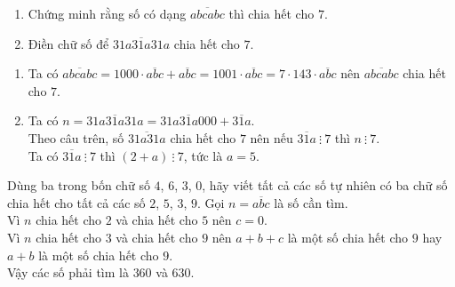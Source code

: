 \begin{bt}%
 \textrm{}
 \begin{enumerate}
  \item Chứng minh rằng số có dạng $\overline{abcabc}$ thì chia hết cho $7$.
  \item Điền chữ số để $\overline{31a31a31a}$ chia hết cho $7$.
 \end{enumerate}
 \loigiai
  {
  \begin{enumerate}
   \item Ta có $\overline{abcabc} = 1000\cdot \overline{abc}+\overline{abc} = 1001 \cdot \overline{abc} = 7 \cdot 143 \cdot \overline{abc}$ nên $\overline{abcabc}$ chia hết cho $7$.
   \item Ta có $n = \overline{31a31a31a} = \overline{31a31a000} + \overline{31a}$.\\
   Theo câu trên, số $\overline{31a31a}$ chia hết cho $7$ nên nếu $\overline{31a}\ \vdots\ 7$ thì $n\ \vdots\ 7$.\\
   Ta có $\overline{31a}\ \vdots\ 7$ thì $(2+a)\ \vdots\ 7$, tức là $a=5$.
  \end{enumerate}
  }
\end{bt}

\begin{bt}%
 Dùng ba trong bốn chữ số $4$, $6$, $3$, $0$, hãy viết tất cả các số tự nhiên có ba chữ số chia hết cho tất cả các số $2$, $5$, $3$, $9$.
 \loigiai
  {
  Gọi $n=\overline{abc}$ là số cần tìm.\\
  Vì $n$ chia hết cho $2$ và chia hết cho $5$ nên $c=0$.\\
  Vì $n$ chia hết cho $3$ và chia hết cho $9$ nên $a+b+c$ là một số chia hết cho $9$ hay $a+b$ là một số chia hết cho $9$.\\
  Vậy các số phải tìm là $360$ và $630$.
  }
\end{bt}


